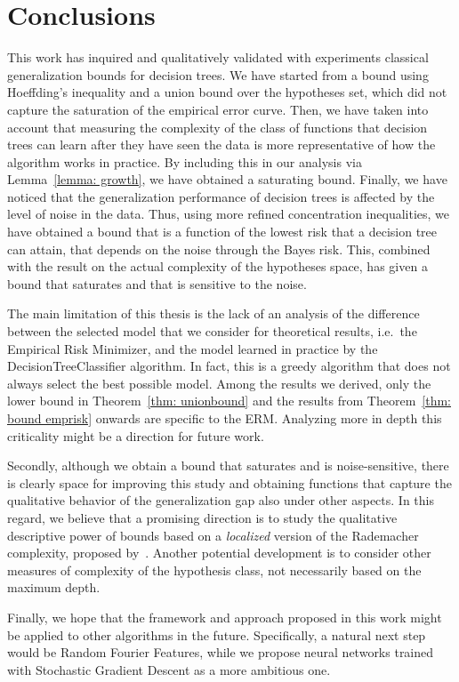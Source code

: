 \documentclass[reqno]{amsart}
\let\oldsection\section
\renewcommand{\section}{\clearpage\thispagestyle{plain}\oldsection}
\begin{document}
\newpage
\section{Conclusions}\label{sec: concl}

This work has inquired and qualitatively validated with experiments classical generalization bounds for decision trees. We have started from a bound using Hoeffding's inequality and a union bound over the hypotheses set, which did not capture the saturation of the empirical error curve. Then, we have taken into account that measuring the complexity of the class of functions that decision trees can learn after they have seen the data is more representative of how the algorithm works in practice. By including this in our analysis via Lemma~\ref{lemma: growth}, we have obtained a saturating bound. Finally, 
we have noticed that the generalization performance of decision trees is affected by the level of noise in the data. Thus, using more refined concentration inequalities, we have obtained a bound that is a function of the lowest risk that a decision tree can attain, that depends on the noise through the Bayes risk. This, combined with the result on the actual complexity of the hypotheses space, has given a bound that saturates and that is sensitive to the noise. 

The main limitation of this thesis is the lack of an analysis of the difference between the selected model that we consider for theoretical results, i.e.\ the Empirical Risk Minimizer, and the model learned in practice by the DecisionTreeClassifier algorithm. In fact, this is a greedy algorithm that does not always select the best possible model. Among the results we derived, only the lower bound in Theorem~\ref{thm: unionbound} and the results from Theorem~\ref{thm: bound emprisk} onwards are specific to the ERM. Analyzing more in depth this criticality might be a direction for future work. 

Secondly, although we obtain a bound that saturates and is noise-sensitive, there is clearly space for improving this study and obtaining functions that capture the qualitative behavior of the generalization gap also under other aspects. In this regard, we believe that a promising direction is to study the qualitative descriptive power of bounds based on a {\it localized\/} version of the Rademacher complexity, proposed by~\cite{Bartlett_2005}. Another potential development is to consider other measures of complexity of the hypothesis class, not necessarily based on the maximum depth. 

Finally, we hope that the framework and approach proposed in this work might be applied to other algorithms in the future. Specifically, a natural next step would be Random Fourier Features, while we propose neural networks trained with Stochastic Gradient Descent as a more ambitious one. 

\newpage



\newpage
\appendix

\end{document}
